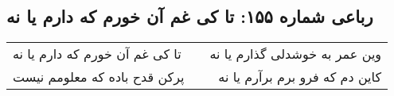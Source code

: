 \begin{center}
\section*{رباعی شماره ۱۵۵: تا کی غم آن خورم که دارم یا نه}
\label{sec:sh155}
\begin{longtable}{l p{0.5cm} r}
تا کی غم آن خورم که دارم یا نه
&&
وین عمر به خوشدلی گذارم یا نه
\\
پرکن قدح باده که معلومم نیست
&&
کاین دم که فرو برم برآرم یا نه
\\
\end{longtable}
\end{center}
